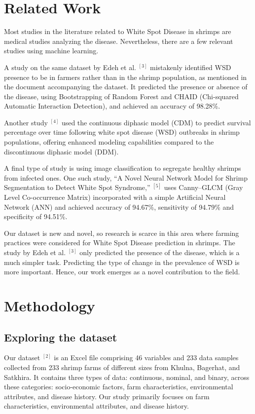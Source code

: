 \documentclass[journal,comsoc]{IEEEtran}
\begin{document}
\section{Related Work}
Most studies in the literature related to White Spot Disease in shrimps are medical studies analyzing the disease. Nevertheless, there are a few relevant studies using machine learning.

A study on the same dataset by Edeh et al. $^{[3]}$ mistakenly identified WSD presence to be in farmers rather than in the shrimp population, as mentioned in the document accompanying the dataset. It predicted the presence or absence of the disease, using Bootstrapping of Random Forest and CHAID (Chi-squared Automatic Interaction Detection), and achieved an accuracy of 98.28\%.

Another study $^{[4]}$ used the continuous diphasic model (CDM) to predict survival percentage over time following white spot disease (WSD) outbreaks in shrimp populations, offering enhanced modeling capabilities compared to the discontinuous diphasic model (DDM).

A final type of study is using image classification to segregate healthy shrimps from infected ones. One such study, “A Novel Neural Network Model for Shrimp Segmentation to Detect White Spot Syndrome,” $^{[5]}$ uses Canny–GLCM (Gray Level Co-occurrence Matrix) incorporated with a simple Artificial Neural Network (ANN) and achieved accuracy of 94.67\%, sensitivity of 94.79\% and specificity of 94.51\%.

Our dataset is new and novel, so research is scarce in this area where farming practices were considered for White Spot Disease prediction in shrimps. The study by Edeh et al. $^{[3]}$ only predicted the presence of the disease, which is a much simpler task. Predicting the type of change in the prevalence of WSD is more important. Hence, our work emerges as a novel contribution to the field.

\section{Methodology}
\subsection{Exploring the dataset}
Our dataset $^{[2]}$ is an Excel file comprising 46 variables and 233 data samples collected from 233 shrimp farms of different sizes from Khulna, Bagerhat, and Satkhira. It contains three types of data: continuous, nominal, and binary, across these categories: socio-economic factors, farm characteristics, environmental attributes, and disease history. Our study primarily focuses on farm characteristics, environmental attributes, and disease history.
 
\end{document}
